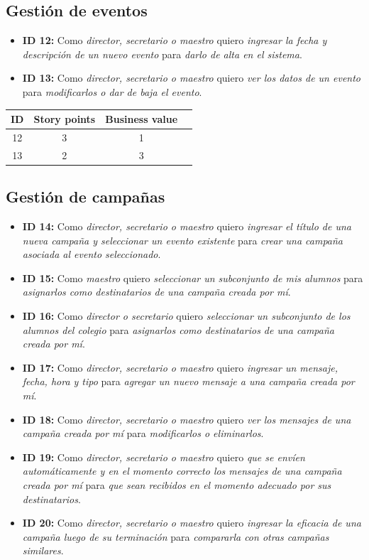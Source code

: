 \documentclass[a4paper, 10pt, twoside]{article}
\newenvironment{stories}{
  \begin{itemize}
}{
  \end{itemize}
}
\newcommand{\story}[4]{
  \item
  \textbf{ID #1:} Como \emph{#2} quiero \emph{#3} para \emph{#4}.
}
\begin{document}
\subsection{Gestión de eventos}

\begin{stories}
  \story{12}{director, secretario o maestro}
        {ingresar la fecha y descripción de un nuevo evento}
        {darlo de alta en el sistema} 

  \story{13}{director, secretario o maestro}
        {ver los datos de un evento}
        {modificarlos o dar de baja el evento} 
\end{stories}

\begin{center}
\begin{tabular}{|c|c|c|c|}
\hline
ID & Story points & Business value\\
\hline
12 & 3 & 1\\
13 & 2 & 3\\
\hline
\end{tabular}
\end{center}

\subsection{Gestión de campañas}

\begin{stories}
  \story{14}{director, secretario o maestro}
        {ingresar el título de una nueva campaña y seleccionar un evento existente}
        {crear una campaña asociada al evento seleccionado} 

  \story{15}{maestro}
        {seleccionar un subconjunto de mis alumnos}
        {asignarlos como destinatarios de una campaña creada por mí} 

  \story{16}{director o secretario}
        {seleccionar un subconjunto de los alumnos del colegio}
        {asignarlos como destinatarios de una campaña creada por mí} 

  \story{17}{director, secretario o maestro}
        {ingresar un mensaje, fecha, hora y tipo}
        {agregar un nuevo mensaje a una campaña creada por mí} 

  \story{18}{director, secretario o maestro}
        {ver los mensajes de una campaña creada por mí} 
        {modificarlos o eliminarlos}

  \story{19}{director, secretario o maestro}
        {que se envíen automáticamente y en el momento correcto los mensajes de una campaña creada por mí}
        {que sean recibidos en el momento adecuado por sus destinatarios} 

  \story{20}{director, secretario o maestro}
        {ingresar la eficacia de una campaña luego de su terminación}
        {compararla con otras campañas similares} 
\end{stories}
\end{document}
